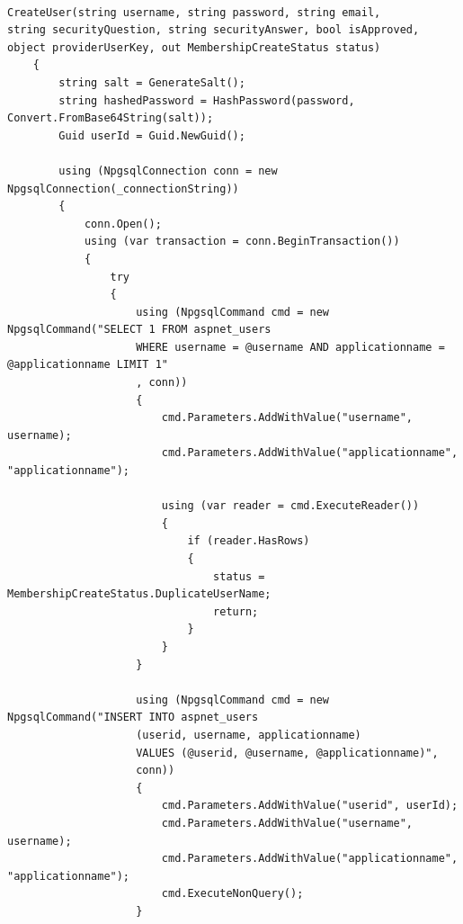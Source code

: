 \documentclass[14pt]{article}
\begin{document}
\begin{verbatim}

CreateUser(string username, string password, string email, 
string securityQuestion, string securityAnswer, bool isApproved, 
object providerUserKey, out MembershipCreateStatus status)
    {
        string salt = GenerateSalt();
        string hashedPassword = HashPassword(password, Convert.FromBase64String(salt));
        Guid userId = Guid.NewGuid();

        using (NpgsqlConnection conn = new NpgsqlConnection(_connectionString))
        {
            conn.Open();
            using (var transaction = conn.BeginTransaction())
            {
                try
                {                       
                    using (NpgsqlCommand cmd = new NpgsqlCommand("SELECT 1 FROM aspnet_users 
                    WHERE username = @username AND applicationname = @applicationname LIMIT 1"
                    , conn))
                    {
                        cmd.Parameters.AddWithValue("username", username);
                        cmd.Parameters.AddWithValue("applicationname", "applicationname");

                        using (var reader = cmd.ExecuteReader())
                        {
                            if (reader.HasRows)
                            {
                                status = MembershipCreateStatus.DuplicateUserName;
                                return;
                            }
                        }
                    }

                    using (NpgsqlCommand cmd = new NpgsqlCommand("INSERT INTO aspnet_users 
                    (userid, username, applicationname) 
                    VALUES (@userid, @username, @applicationname)", 
                    conn))
                    {
                        cmd.Parameters.AddWithValue("userid", userId);
                        cmd.Parameters.AddWithValue("username", username);
                        cmd.Parameters.AddWithValue("applicationname", "applicationname");
                        cmd.ExecuteNonQuery();
                    }


\end{verbatim}
\end{document}
